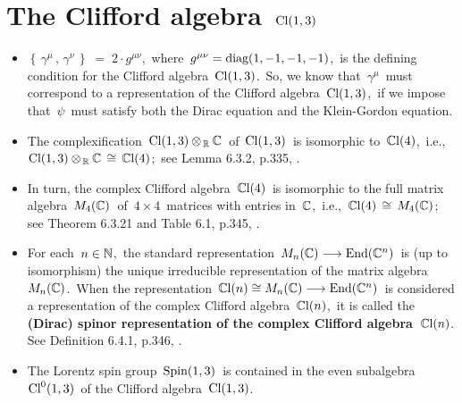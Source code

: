 
\vskip 0.5cm
\section{The Clifford algebra \,$\textnormal{Cl}(1,3)$\,}

\begin{itemize}
\item
    $\left\{\,\gamma^{\mu}\,,\,\gamma^{\nu}\,\right\} \;=\;2\cdot g^{\mu\nu}$,\,
    where \,$g^{\mu\nu} = \textnormal{diag}(1,-1,-1,-1)$,\,
    is the defining condition for the Clifford algebra \,$\textnormal{Cl}(1,3)$.\,
    So, we know that \,$\gamma^{\mu}$\, must correspond to a representation of
    the Clifford algebra \,$\textnormal{Cl}(1,3)$,\,
    if we impose that \,$\psi$\, must satisfy both the Dirac equation and the Klein-Gordon equation. 
\item
    The complexification
    \,$\textnormal{Cl}(1,3)\otimes_{\,\mathbb{R}}\mathbb{C}$\,
    of \,$\textnormal{Cl}(1,3)$\,
    is isomorphic to \,$\mathbb{C}\textnormal{l}(4)$,\, i.e.,
    \,$\textnormal{Cl}(1,3)\otimes_{\,\mathbb{R}}\mathbb{C} \,\cong\, \mathbb{C}\textnormal{l}(4)$;\,
    see Lemma 6.3.2, p.335, \cite{Hamilton2017}.
\item
	In turn, the complex Clifford algebra
	\,$\mathbb{C}\textnormal{l}(4)$\,
	is isomorphic to the full matrix algebra \,$M_{4}(\mathbb{C})$\, of \,$4 \times 4$\, matrices
	with entries in \,$\mathbb{C}$,\, i.e.,
	\,$\mathbb{C}\textnormal{l}(4) \,\cong\, M_{4}(\mathbb{C})$;\,
	see Theorem 6.3.21 and Table 6.1, p.345, \cite{Hamilton2017}.
\item
    For each \,$n \in \mathbb{N}$,\,
    the standard representation
    \,$M_{n}(\mathbb{C}) \longrightarrow \textnormal{End}(\mathbb{C}^{n})$\,
    is (up to isomorphism) the unique irreducible representation of
    the matrix algebra \,$M_{n}(\mathbb{C})$.\,
    \vskip 0.1cm
    When the representation
    \,$\mathbb{C}\textnormal{l}(n) \cong M_{n}(\mathbb{C}) \longrightarrow \textnormal{End}(\mathbb{C}^{n})$\,
    is considered a representation of the complex Clifford algebra
    \,$\mathbb{C}\textnormal{l}(n)$,\, it is called the
    \textbf{(Dirac) spinor representation of the complex Clifford algebra \,$\mathbb{C}\textnormal{l}(n)$}.\,
    See Definition 6.4.1, p.346, \cite{Hamilton2017}.
\item
    The Lorentz spin group \,$\textnormal{Spin}(1,3)$\,
    is contained in the even subalgebra \,$\textnormal{Cl}^{0}(1,3)$\,
    of the Clifford algebra \,$\textnormal{Cl}(1,3)$.\,

\end{itemize}
